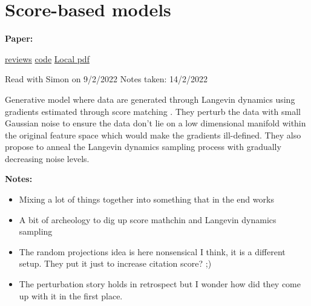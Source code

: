 \clearpage

\section{Score-based models}\label{sec:scorebased}

\begin{notebox}
\textbf{Paper: } 
\vspace{5pt}

\href{https://papers.nips.cc/paper/2019/file/3001ef257407d5a371a96dcd947c7d93-Reviews.html}{reviews}
\hspace{1cm}
\href{https://github.com/yang-song/score_sde_pytorch}{code}
\hspace{1cm}
\href{run:/home/magda/Dropbox/Zot/Song_Ermon_2020_Generative Modeling by Estimating Gradients of the Data Distribution.pdf}{Local pdf}
\vspace{3pt}

Read with Simon on 9/2/2022
\hfill Notes taken: 14/2/2022 
\end{notebox}

\begin{notebox}[colback=red!5]
\tldr 
Generative model where data are generated through Langevin dynamics \parencite{welling_bayesian_2011} using gradients estimated through score matching \parencite{hyvarinen_estimation_2005}.
They perturb the data with small Gaussian noise to ensure the data don't lie on a low dimensional manifold within the original feature space which would make the gradients ill-defined. They also propose to anneal the Langevin dynamics sampling process with gradually decreasing noise levels.
\end{notebox}

\begin{notebox}[colback=yellow!5]
\textbf{Notes:} 
\begin{itemize}[nosep]
\item Mixing a lot of things together into something that in the end works
\item A bit of archeology to dig up score mathchin and Langevin dynamics sampling
\item The random projections idea is here nonsensical I think, it is a different setup. They put it just to increase citation score? ;)
\item The perturbation story holds in retrospect but I wonder how did they come up with it in the first place.
\end{itemize}
\end{notebox}



